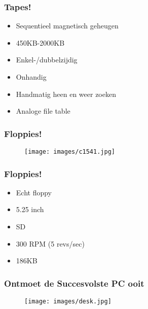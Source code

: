 \documentclass[aspectratio=43]{uva-inf-presentation}
\begin{document}
\begin{frame}
\frametitle{Tapes!}

\begin{itemize}
\item Sequentieel magnetisch geheugen
\item 450KB-2000KB
\item Enkel-/dubbelzijdig
\item Onhandig
\item Handmatig heen en weer zoeken
\item Analoge file table
\end{itemize}

\end{frame}


\begin{frame}
\frametitle{Floppies!}

\begin{figure}
\texttt{[image: images/c1541.jpg]}
\end{figure}

\end{frame}


\begin{frame}
\frametitle{Floppies!}

\begin{itemize}
\item Echt floppy
\item 5.25 inch
\item SD
\item 300 RPM (5 revs/sec)
\item 186KB
\end{itemize}

\end{frame}


\begin{frame}
\frametitle{Ontmoet de Succesvolste PC ooit}

\begin{figure}
\texttt{[image: images/desk.jpg]}
\end{figure}

\end{frame}

\end{document}
